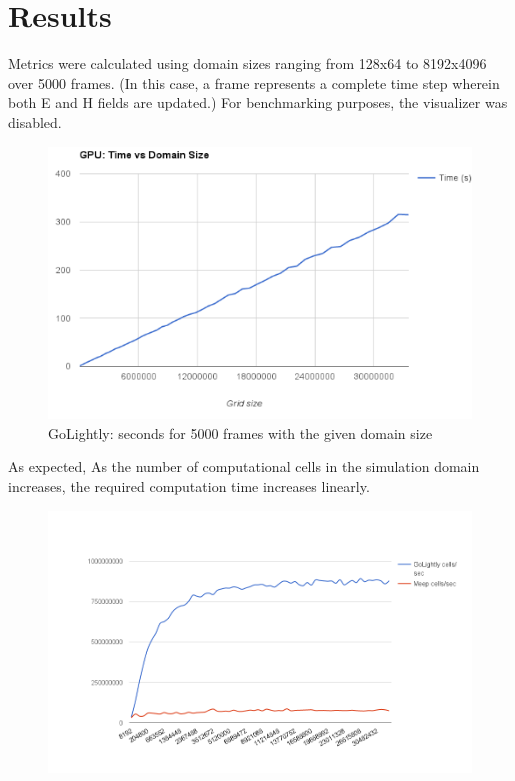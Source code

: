 \chapter{Results} \label{ch:conclusions}


Metrics were calculated using domain sizes ranging from 128x64 to 8192x4096 over 5000 frames. (In this case, a frame represents a complete time step wherein both E and H fields are updated.) For benchmarking purposes, the visualizer was disabled.

\begin{figure}[H]
	\centering
	\includegraphics[width=\textwidth,
	keepaspectratio]{gpu_time_vs_domain_size.png}
	\caption{GoLightly: seconds for 5000 frames with the given domain size}
	\label{fig:gpuTimeVsDomainSize}
\end{figure}

As expected, As the number of computational cells in the simulation domain increases, the required computation time increases linearly.

\begin{figure}[H]
	\centering
	\includegraphics[width=\textwidth,
	keepaspectratio]{cells-per-second.png}
	\label{fig:gridSizeVsComputeTime}
\end{figure}


